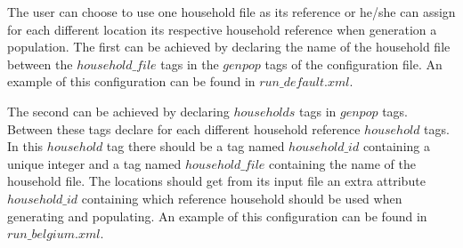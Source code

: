 The user can choose to use one household file as its reference or he/she can assign for each different location its respective household reference when generation a population.
The first can be achieved by declaring the name of the household file between the $household\_file$ tags in the $genpop$ tags of the configuration file.
An example of this configuration can be found in $run\_default.xml$.


The second can be achieved by declaring $households$ tags in $genpop$ tags. Between these tags declare for each different household reference $household$ tags.
In this $household$ tag there should be a tag named $household\_id$ containing a unique integer and a tag named $household\_file$ containing the name of the household file.
The locations should get from its input file an extra attribute $household\_id$ containing which reference household should be used when generating and populating.
An example of this configuration can be found in $run\_belgium.xml$.
